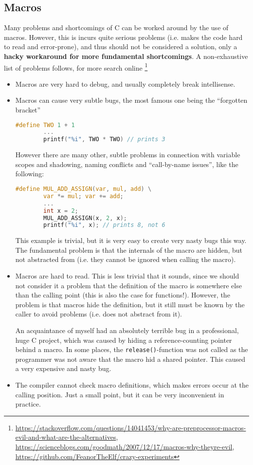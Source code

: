 \documentclass{scrartcl}
\begin{document}
\subsection{Macros}
Many problems and shortcomings of C can be worked around by the use of macros.
However, this is incurs quite serious problems (i.e. makes the code hard to read and error-prone), and thus should not be considered a solution, only a \textbf{hacky workaround for more fundamental shortcomings}.
A non-exhaustive list of problems follows, for more search online
\footnote{\href{https://stackoverflow.com/questions/14041453/why-are-preprocessor-macros-evil-and-what-are-the-alternatives}{https://stackoverflow.com/questions/14041453/why-are-preprocessor-macros-evil-and-what-are-the-alternatives}, \href{https://scienceblogs.com/goodmath/2007/12/17/macros-why-theyre-evil}{https://scienceblogs.com/goodmath/2007/12/17/macros-why-theyre-evil}, \href{https://github.com/FeanorTheElf/crazy-experiments}{https://github.com/FeanorTheElf/crazy-experiments}}
\begin{itemize}
    \item Macros are very hard to debug, and usually completely break intellisense.
    \item Macros can cause very subtle bugs, the most famous one being the ``forgotten bracket''
    \begin{lstlisting}[language = c]
        #define TWO 1 + 1
        ...
        printf("%i", TWO * TWO) // prints 3 
    \end{lstlisting}
    However there are many other, subtle problems in connection with variable scopes and shadowing, naming conflicts and ``call-by-name issues'', like the following:
    \begin{lstlisting}[language = c]
        #define MUL_ADD_ASSIGN(var, mul, add) \
        var *= mul; var += add;
        ...
        int x = 2;
        MUL_ADD_ASSIGN(x, 2, x);
        printf("%i", x); // prints 8, not 6
    \end{lstlisting}
    This example is trivial, but it is very easy to create very nasty bugs this way.
    The fundamental problem is that the internals of the macro are hidden, but not abstracted from (i.e. they cannot be ignored when calling the macro).
    \item Macros are hard to read.
    This is less trivial that it sounds, since we should not consider it a problem that the definition of the macro is somewhere else than the calling point (this is also the case for functions!).
    However, the problem is that macros hide the definition, but it still must be known by the caller to avoid problems (i.e. does not abstract from it).

    An acquaintance of myself had an absolutely terrible bug in a professional, huge C project, which was caused by hiding a reference-counting pointer behind a macro.
    In some places, the \lstinline{release()}-function was not called as the programmer was not aware that the macro hid a shared pointer.
    This caused a very expensive and nasty bug.
    \item The compiler cannot check macro definitions, which makes errors occur at the calling position.
    Just a small point, but it can be very inconvenient in practice.
\end{itemize}
\end{document}
